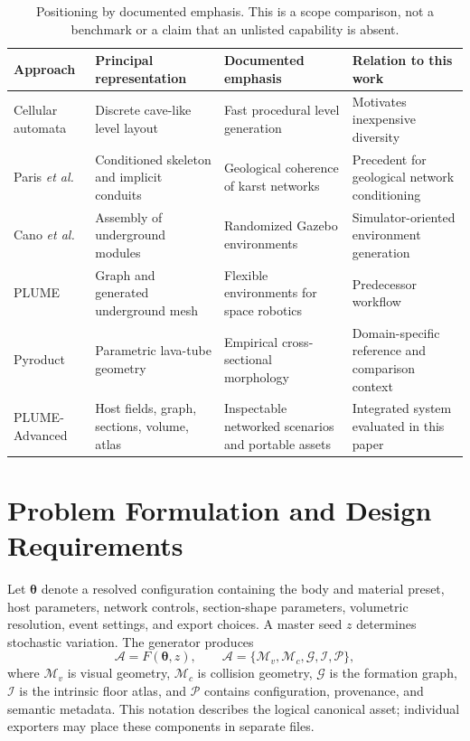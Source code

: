 \documentclass[conference]{IEEEtran}
\begin{document}
\begin{table}[t]
\caption{Positioning by documented emphasis. This is a scope comparison, not a benchmark or a claim that an unlisted capability is absent.}
\label{tab:related}
\centering\small
\begin{tabularx}{\textwidth}{@{}p{2.65cm}YYY@{}}
\toprule
Approach & Principal representation & Documented emphasis & Relation to this work \\
\midrule
Cellular automata \cite{johnson2010} & Discrete cave-like level layout & Fast procedural level generation & Motivates inexpensive diversity \\
Paris \emph{et al.}\ \cite{paris2021} & Conditioned skeleton and implicit conduits & Geological coherence of karst networks & Precedent for geological network conditioning \\
Cano \emph{et al.}\ \cite{cano_gazebo} & Assembly of underground modules & Randomized Gazebo environments & Simulator-oriented environment generation \\
PLUME \cite{plume2025} & Graph and generated underground mesh & Flexible environments for space robotics & Predecessor workflow \\
Pyroduct \cite{pyroduct2026} & Parametric lava-tube geometry & Empirical cross-sectional morphology & Domain-specific reference and comparison context \\
PLUME-Advanced & Host fields, graph, sections, volume, atlas & Inspectable networked scenarios and portable assets & Integrated system evaluated in this paper \\
\bottomrule
\end{tabularx}
\end{table}

\section{Problem Formulation and Design Requirements}
\label{sec:formulation}
Let $\boldsymbol{\theta}$ denote a resolved configuration containing the body and material preset, host parameters, network controls, section-shape parameters, volumetric resolution, event settings, and export choices. A master seed $z$ determines stochastic variation. The generator produces
\begin{equation}
\mathcal{A}=F(\boldsymbol{\theta},z),\qquad
\mathcal{A}=\{\mathcal{M}_v,\mathcal{M}_c,\mathcal{G},\mathcal{I},\mathcal{P}\},
\label{eq:asset}
\end{equation}
where $\mathcal{M}_v$ is visual geometry, $\mathcal{M}_c$ is collision geometry, $\mathcal{G}$ is the formation graph, $\mathcal{I}$ is the intrinsic floor atlas, and $\mathcal{P}$ contains configuration, provenance, and semantic metadata. This notation describes the logical canonical asset; individual exporters may place these components in separate files.
\end{document}
